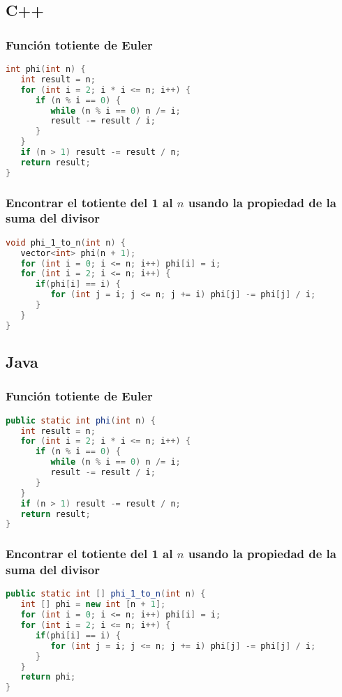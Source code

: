 \subsection{C++}

\subsubsection{Función totiente de Euler}
\begin{lstlisting}[language=C++]
int phi(int n) {
   int result = n;
   for (int i = 2; i * i <= n; i++) {
      if (n % i == 0) {
         while (n % i == 0) n /= i;
         result -= result / i;
      }
   }
   if (n > 1) result -= result / n;
   return result;
}
\end{lstlisting}

\subsubsection{Encontrar el totiente del 1 al $n$ usando la propiedad de la suma del divisor}
\begin{lstlisting}[language=C++]
void phi_1_to_n(int n) {
   vector<int> phi(n + 1);
   for (int i = 0; i <= n; i++) phi[i] = i;
   for (int i = 2; i <= n; i++) {
      if(phi[i] == i) {
         for (int j = i; j <= n; j += i) phi[j] -= phi[j] / i;
      }
   }
}
\end{lstlisting}


\subsection{Java}

\subsubsection{Función totiente de Euler}
\begin{lstlisting}[language=Java]
public static int phi(int n) {
   int result = n;
   for (int i = 2; i * i <= n; i++) {
      if (n % i == 0) {
         while (n % i == 0) n /= i;
         result -= result / i;
      }
   }
   if (n > 1) result -= result / n;
   return result;
}
\end{lstlisting}

\subsubsection{Encontrar el totiente del 1 al $n$ usando la propiedad de la suma del divisor}
\begin{lstlisting}[language=Java]
public static int [] phi_1_to_n(int n) {
   int [] phi = new int [n + 1];
   for (int i = 0; i <= n; i++) phi[i] = i;
   for (int i = 2; i <= n; i++) {
      if(phi[i] == i) {
         for (int j = i; j <= n; j += i) phi[j] -= phi[j] / i;
      }
   }
   return phi;
}
\end{lstlisting}
